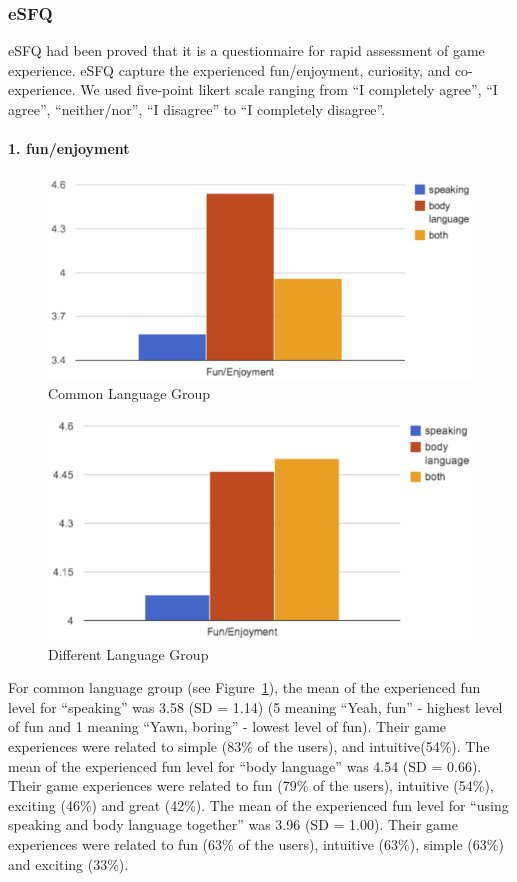 \subsubsection{eSFQ}
eSFQ\cite{eSFQ} had been proved that it is a questionnaire for rapid assessment of game experience. eSFQ capture the experienced fun/enjoyment, curiosity, and co-experience. We used five-point likert scale ranging from ``I completely agree'', ``I agree'', ``neither/nor'', ``I disagree'' to ``I completely disagree''.

\paragraph{1. fun/enjoyment}

\begin{figure}[!h]
\centering
\includegraphics[width=0.9\columnwidth]{Figures/US_Fun_Com.png}
\caption{Common Language Group}
\label{fig:US_Fun_Com}
\end{figure}

\begin{figure}[!h]
\centering
\includegraphics[width=0.9\columnwidth]{Figures/US_Fun_Dif.png}
\caption{Different Language Group}
\label{fig:US_Fun_Dif}
\end{figure}

For common language group (see Figure~\ref{fig:US_Fun_Com}), the mean of the experienced fun level for ``speaking'' was 3.58 (SD = 1.14) (5 meaning ``Yeah, fun'' - highest level of fun and 1 meaning ``Yawn, boring'' - lowest level of fun). Their game experiences were related to simple (83\% of the users), and intuitive(54\%). The mean of the experienced fun level for ``body language'' was 4.54 (SD = 0.66). Their game experiences were related to fun (79\% of the users), intuitive (54\%), exciting (46\%) and great (42\%). The mean of the experienced fun level for ``using speaking and body language together'' was 3.96 (SD = 1.00). Their game experiences were related to fun (63\% of the users), intuitive (63\%), simple (63\%) and exciting (33\%). 

